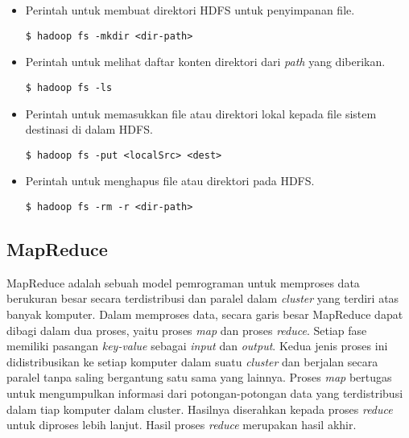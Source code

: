 \begin{itemize}
\item Perintah untuk membuat direktori HDFS untuk penyimpanan file.

\begin{verbatim}
$ hadoop fs -mkdir <dir-path>
\end{verbatim}
 
\item Perintah untuk melihat daftar konten direktori dari \textit{path} yang diberikan.

\begin{verbatim}
$ hadoop fs -ls 
\end{verbatim}

\item Perintah untuk memasukkan file atau direktori lokal kepada file sistem destinasi di dalam HDFS.

\begin{verbatim}
$ hadoop fs -put <localSrc> <dest> 
\end{verbatim}

\item Perintah untuk menghapus file atau direktori pada HDFS.

\begin{verbatim}
$ hadoop fs -rm -r <dir-path> 
\end{verbatim}


\end{itemize}


\subsection{MapReduce~\cite{tomwhite:05:htdg}}

MapReduce adalah sebuah model pemrograman untuk memproses data berukuran besar secara terdistribusi dan paralel dalam \textit{cluster} yang terdiri atas banyak komputer. Dalam memproses data, secara garis besar MapReduce dapat dibagi dalam dua proses, yaitu proses \textit{map} dan proses \textit{reduce}. Setiap fase memiliki pasangan \textit{key-value} sebagai \textit{input} dan \textit{output}. Kedua jenis proses ini didistribusikan ke setiap komputer dalam suatu \textit{cluster} dan berjalan secara paralel tanpa saling bergantung satu sama yang lainnya. Proses \textit{map} bertugas untuk mengumpulkan informasi dari potongan-potongan data yang terdistribusi dalam tiap komputer dalam cluster. Hasilnya diserahkan kepada proses \textit{reduce} untuk diproses lebih lanjut. Hasil proses \textit{reduce} merupakan hasil akhir.\\

